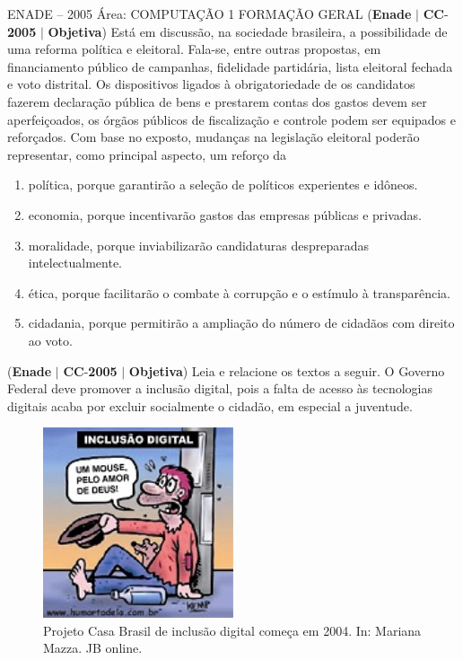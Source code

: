 \documentclass{exam}
\begin{document}
\begin{questions}
ENADE – 2005 Área: COMPUTAÇÃO 1
FORMAÇÃO GERAL
\question (\textbf{Enade} $|$ \textbf{CC}-\textbf{2005} $|$ \textbf{Objetiva})
Está em discussão, na sociedade brasileira, a possibilidade de uma
reforma política e eleitoral. Fala-se, entre outras propostas, em
financiamento público de campanhas, fidelidade partidária, lista
eleitoral fechada e voto distrital. Os dispositivos ligados à
obrigatoriedade de os candidatos fazerem declaração pública de
bens e prestarem contas dos gastos devem ser aperfeiçoados, os
órgãos públicos de fiscalização e controle podem ser equipados
e reforçados.
Com base no exposto, mudanças na legislação eleitoral poderão
representar, como principal aspecto, um reforço da
	\begin{enumerate}[label=\alph*)]
		\item  política, porque garantirão a seleção de políticos experientes
e idôneos.
		\item  economia, porque incentivarão gastos das empresas públicas
e privadas.
		\item  moralidade, porque inviabilizarão candidaturas despreparadas
intelectualmente.
		\item  ética, porque facilitarão o combate à corrupção e o estímulo
à transparência.
		\item  cidadania, porque permitirão a ampliação do número de
cidadãos com direito ao voto.
	\end{enumerate}

\question (\textbf{Enade} $|$ \textbf{CC}-\textbf{2005} $|$ \textbf{Objetiva})
Leia e relacione os textos a seguir.
O Governo Federal deve
promover a inclusão digital, pois
a falta de acesso às tecnologias
digitais acaba por excluir
socialmente o cidadão, em
especial a juventude.

\begin{figure}[H]
	\begin{center}
		\includegraphics[width=0.5\textwidth]{CIENCIA_DA_COMPUTACAO_Prova2005-utf8_figuras/fig-0001.jpg}
		\caption{Projeto Casa Brasil de inclusão digital começa em 2004. In: Mariana Mazza. JB online.}
	\end{center}
\end{figure}



\end{questions}
\end{document}
